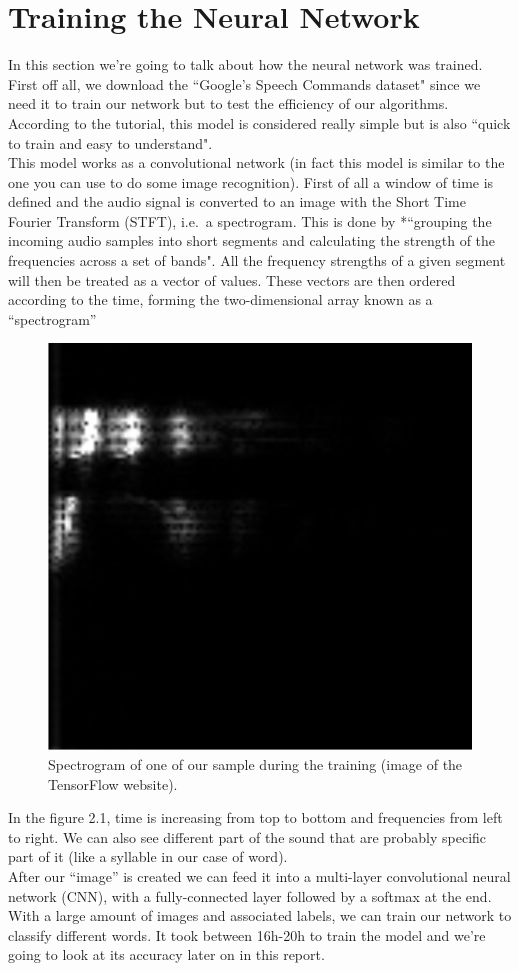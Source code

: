 \documentclass[11pt,a4paper,titlepage]{report}
\begin{document}
\section{Training the Neural Network}
\hspace*{0.6cm}
In this section we're going to talk about how the neural network was trained. First off all, we download the ``Google's Speech Commands dataset" since we need it to train our network but to test the efficiency of our algorithms. According to the tutorial, this model is considered really simple but is also ``quick to train and easy to understand".\\
\hspace*{0.6cm}
This model works as a convolutional network (in fact this model is similar to the one you can use to do some image recognition). First of all a window of time is defined and the audio signal is converted to an image with the Short Time Fourier Transform (STFT), i.e.\ a spectrogram. This is done by *``grouping the incoming audio samples into short segments and calculating the strength of the frequencies across a set of bands". All the frequency strengths of a given segment will then be treated as a vector of values. These vectors are then ordered according to the time, forming the two-dimensional array known as a ``spectrogram''\\
\begin{figure}[h]
	\centering
	\includegraphics[width=0.7\linewidth]{Rapport2}
	\caption{Spectrogram of one of our sample during the training (image of the TensorFlow website).}
\end{figure}

\hspace*{0.6cm}
In the figure 2.1, time is increasing from top to bottom and frequencies from left to right. We can also see different part of the sound that are probably specific part of it (like a syllable in our case of word).\\
\hspace*{0.6cm}
After our ``image'' is created we can feed it into a multi-layer convolutional neural network (CNN), with a fully-connected layer followed by a softmax at the end. With a large amount of images and associated labels, we can train our network to classify different words. It took between 16h-20h to train the model and we're going to look at its accuracy later on in this report.
\end{document}
